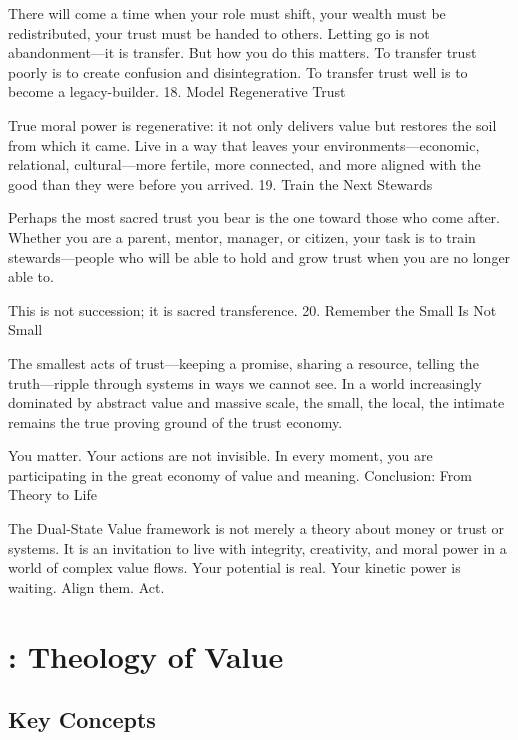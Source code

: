 \documentclass[11pt,oneside]{book}
\begin{document}
There will come a time when your role must shift, your wealth must be redistributed, your trust must be handed to others. Letting go is not abandonment—it is transfer. But how you do this matters. To transfer trust poorly is to create confusion and disintegration. To transfer trust well is to become a legacy-builder.
18. Model Regenerative Trust

True moral power is regenerative: it not only delivers value but restores the soil from which it came. Live in a way that leaves your environments—economic, relational, cultural—more fertile, more connected, and more aligned with the good than they were before you arrived.
19. Train the Next Stewards

Perhaps the most sacred trust you bear is the one toward those who come after. Whether you are a parent, mentor, manager, or citizen, your task is to train stewards—people who will be able to hold and grow trust when you are no longer able to.

This is not succession; it is sacred transference.
20. Remember the Small Is Not Small

The smallest acts of trust—keeping a promise, sharing a resource, telling the truth—ripple through systems in ways we cannot see. In a world increasingly dominated by abstract value and massive scale, the small, the local, the intimate remains the true proving ground of the trust economy.

You matter. Your actions are not invisible. In every moment, you are participating in the great economy of value and meaning.
Conclusion: From Theory to Life

The Dual-State Value framework is not merely a theory about money or trust or systems. It is an invitation to live with integrity, creativity, and moral power in a world of complex value flows. Your potential is real. Your kinetic power is waiting. Align them. Act.


\chapter{: Theology of Value}

\section{Key Concepts}
\end{document}
